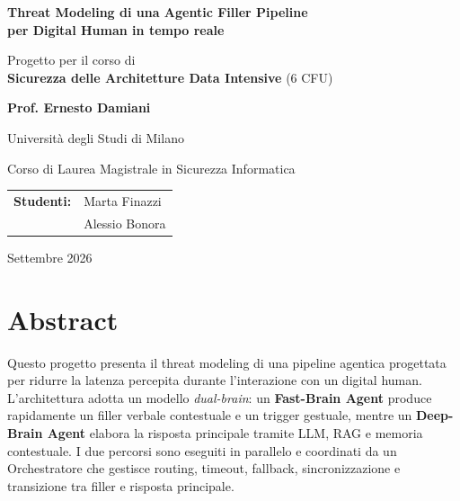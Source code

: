 \documentclass[11pt,a4paper]{article}
\newcommand{\Course}{Sicurezza delle Architetture Data Intensive}
\newcommand{\Professor}{Ernesto Damiani}
\newcommand{\University}{Università degli Studi di Milano}
\newcommand{\Degree}{Corso di Laurea Magistrale in Sicurezza Informatica}
\newcommand{\StudentOne}{Marta Finazzi}
\newcommand{\StudentTwo}{Alessio Bonora}
\begin{document}

\begin{titlepage}
\centering
\vspace*{1.3cm}
{\Large\bfseries Threat Modeling di una Agentic Filler Pipeline\\[0.25cm]
per Digital Human in tempo reale}\par
\vspace{1.5cm}
{\large Progetto per il corso di\\[0.15cm]
\textbf{\Course} (6 CFU)}\par
\vspace{0.8cm}
{\large \textbf{Prof. \Professor}}\par
\vspace{0.35cm}
{\large \University}\par
\vspace{0.2cm}
{\large \Degree}\par
\vspace{2.2cm}
\begin{tabular}{rl}
\textbf{Studenti:} & \StudentOne \\
                    & \StudentTwo \\
\end{tabular}
\vfill
{\large Settembre 2026}
\end{titlepage}

\tableofcontents
\clearpage
{}

\section{Abstract}

Questo progetto presenta il threat modeling di una pipeline agentica
progettata per ridurre la latenza percepita durante l'interazione con
un digital human. L'architettura adotta un modello \emph{dual-brain}:
un \textbf{Fast-Brain Agent} produce rapidamente un filler verbale
contestuale e un trigger gestuale, mentre un \textbf{Deep-Brain Agent}
elabora la risposta principale tramite LLM, RAG e memoria contestuale.
I due percorsi sono eseguiti in parallelo e coordinati da un
Orchestratore che gestisce routing, timeout, fallback, sincronizzazione
e transizione tra filler e risposta principale.
\end{document}
